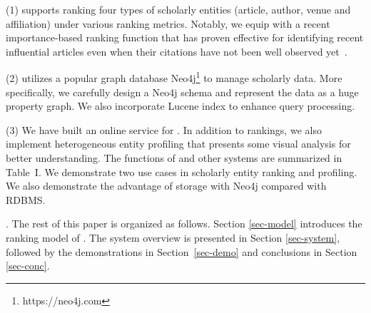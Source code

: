 \noindent (1) \oursystem supports ranking four types of scholarly entities (\ie article, author, venue and affiliation) under various ranking metrics. Notably, we equip \oursystem with a recent importance-based ranking function that has proven effective for identifying recent influential articles even when their citations have not been well observed yet~\cite{ma2018query}.


\noindent (2) \oursystem utilizes a popular graph database Neo4j\footnote{https://neo4j.com} to manage scholarly data. More specifically, we carefully design a Neo4j schema and represent the data as a huge property graph. We also incorporate Lucene index to enhance query processing.


\noindent (3) We have built an online service for \oursystem. In addition to rankings, we also implement heterogeneous entity profiling that presents some visual analysis for better understanding. The functions of \oursystem and other systems are summarized in Table~I. We demonstrate two use cases in scholarly entity ranking and profiling. We also demonstrate the advantage of storage with Neo4j compared with RDBMS.



.
The rest of this paper is organized as follows. Section \ref{sec-model} introduces the ranking model of \oursystem. The system overview is presented in Section \ref{sec-system}, followed by the demonstrations in Section~\ref{sec-demo} and conclusions in Section \ref{sec-conc}.
